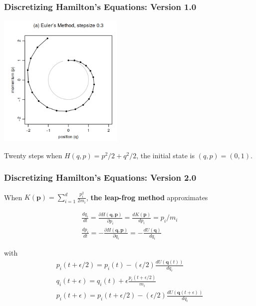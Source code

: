\documentclass{beamer}
\begin{document}
\begin{frame}
\frametitle{Discretizing Hamilton's Equations: Version 1.0}

\begin{center}
\includegraphics[width=60mm]{eulers_method.png}
\end{center}

Twenty steps when $H(q,p) = p^2/2 + q^2/2$, the initial state is $(q,p) = (0,1)$. 

\end{frame}
\begin{frame}
\frametitle{Discretizing Hamilton's Equations: Version 2.0}

When $K(\mathbf{p})= \sum_{i=1}^d \frac{p_i^2}{2m_i}$, {\bf the leap-frog method} approximates

\begin{gather}
\frac{dq_i}{dt} = \frac{\partial H(\mathbf{q},\mathbf{p})}{\partial p_i} =  \frac{d K(\mathbf{p}) }{d p_i} = p_i/m_i  \\
\frac{dp_i}{dt} = -\frac{\partial H(\mathbf{q},\mathbf{p})}{\partial q_i} = -\frac{d U(\mathbf{q})}{d q_i} 
\end{gather}

with
\begin{gather}
p_i(t + \epsilon/2) =  p_i(t) - (\epsilon/2) \frac{d U(\mathbf{q}(t)) }{d q_i} \\
q_i(t + \epsilon) = q_i(t ) + \epsilon \frac{p_i(t+\epsilon/2)}{m_i} \\
p_i(t + \epsilon) =  p_i(t + \epsilon/2) - (\epsilon/2) \frac{d U(\mathbf{q}(t+\epsilon)) }{d q_i} 
\end{gather}


\end{frame}
\end{document}
